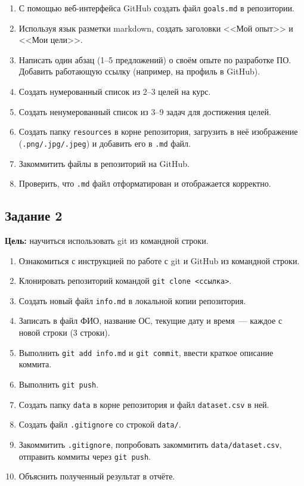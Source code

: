 \documentclass[a4paper,14pt]{extarticle}
\begin{document}
\begin{enumerate}
    \item С помощью веб-интерфейса GitHub создать файл \texttt{goals.md} в репозитории.
    \item Используя язык разметки markdown, создать заголовки <<Мой опыт>> и <<Мои цели>>.
    \item Написать один абзац (1--5 предложений) о своём опыте по разработке ПО. Добавить работающую ссылку (например, на профиль в GitHub).
    \item Создать нумерованный список из 2--3 целей на курс.
    \item Создать ненумерованный список из 3--9 задач для достижения целей.
    \item Создать папку \texttt{resources} в корне репозитория, загрузить в неё изображение (\texttt{.png/.jpg/.jpeg}) и добавить его в \texttt{.md} файл.
    \item Закоммитить файлы в репозиторий на GitHub.
    \item Проверить, что \texttt{.md} файл отформатирован и отображается корректно.
\end{enumerate}

\subsection*{Задание 2}
\textbf{Цель:} научиться использовать git из командной строки.

\begin{enumerate}
    \item Ознакомиться с инструкцией по работе с git и GitHub из командной строки.
    \item Клонировать репозиторий командой \texttt{git clone <ссылка>}.
    \item Создать новый файл \texttt{info.md} в локальной копии репозитория.
    \item Записать в файл ФИО, название ОС, текущие дату и время~--- каждое с новой строки (3 строки).
    \item Выполнить \texttt{git add info.md} и \texttt{git commit}, ввести краткое описание коммита.
    \item Выполнить \texttt{git push}.
    \item Создать папку \texttt{data} в корне репозитория и файл \texttt{dataset.csv} в ней.
    \item Создать файл \texttt{.gitignore} со строкой \texttt{data/}.
    \item Закоммитить \texttt{.gitignore}, попробовать закоммитить \texttt{data/dataset.csv}, отправить коммиты через \texttt{git push}.
    \item Объяснить полученный результат в отчёте.
\end{enumerate}
\end{document}
